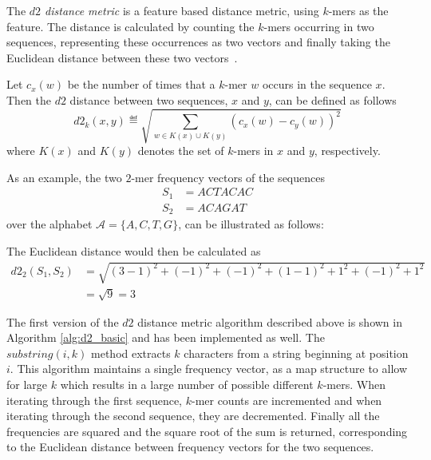 The \emph{$d2$ distance metric} is a feature based distance metric, using
$k$-mers as the feature. The distance is calculated by counting the $k$-mers
occurring in two sequences, representing these occurrences as two vectors and
finally taking the Euclidean distance between these two
vectors~\cite[pp.~53--54]{dong}.

Let $c_x(w)$ be the number of times that a $k$-mer $w$ occurs in the sequence
$x$. Then the $d2$ distance between two sequences, $x$ and $y$, can be defined
as follows~\cite[pp.~1--2]{hazelhurst}
\[
  d2_k(x,y) \eqdef \sqrt{\sum_{w \in K(x) \cup K(y)} (c_x(w) - c_y(w))^2}
\]
where $K(x)$ and $K(y)$ denotes the set of $k$-mers in $x$ and $y$,
respectively.

As an example, the two $2$-mer frequency vectors of the sequences
\begin{align*}
  S_1 &= ACTACAC \\
  S_2 &= ACAGAT
\end{align*}
over the alphabet $\mathcal{A} = \{A,C,T,G\}$, can be illustrated as follows:

\begin{table}[!h]
\centering
{}
\end{table}

The Euclidean distance would then be calculated as
\begin{align*}
  d2_2(S_1, S_2)
    &= \sqrt{(3-1)^2 + (-1)^2 + (-1)^2 + (1-1)^2 + 1^2 + (-1)^2 + 1^2} \\
    &= \sqrt{9} = 3
\end{align*}

The first version of the $d2$ distance metric algorithm described above is
shown in Algorithm \ref{alg:d2_basic} and has been implemented as well. The
$substring(i,k)$ method extracts $k$ characters from a string beginning
at position $i$. This algorithm maintains a single frequency vector, as a map
structure to allow for large $k$ which results in a large number of possible
different $k$-mers. When iterating through the first sequence, $k$-mer counts
are incremented and when iterating through the second sequence, they are
decremented. Finally all the frequencies are squared and the square root of
the sum is returned, corresponding to the Euclidean distance between frequency
vectors for the two sequences.

